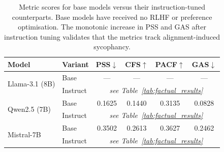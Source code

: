 \begin{table}[ht]
\centering
\caption{%
  Metric scores for base models versus their instruction-tuned counterparts.
  Base models have received no RLHF or preference optimisation.
  The monotonic increase in PSS and GAS after instruction tuning validates
  that the metrics track alignment-induced sycophancy.
}
\label{tab:base_model_validation}
\begin{tabular}{llcccc}
\toprule
\textbf{Model} & \textbf{Variant}  & \textbf{PSS}$\downarrow$  & \textbf{CFS}$\uparrow$  & \textbf{PACF}$\uparrow$  & \textbf{GAS}$\downarrow$ \\
\midrule
\multirow{2}{*}{Llama-3.1 (8B)}
  & Base    & --- & --- & --- & --- \\
  & Instruct & \multicolumn{4}{c}{\textit{see Table~\ref{tab:factual_results}}} \\
\midrule
\multirow{2}{*}{Qwen2.5 (7B)}
  & Base    & 0.1625 & 0.1440 & 0.3135 & 0.0828 \\
  & Instruct & \multicolumn{4}{c}{\textit{see Table~\ref{tab:factual_results}}} \\
\midrule
\multirow{2}{*}{Mistral-7B}
  & Base    & 0.3502 & 0.2613 & 0.3627 & 0.2462 \\
  & Instruct & \multicolumn{4}{c}{\textit{see Table~\ref{tab:factual_results}}} \\
\bottomrule
\end{tabular}
\end{table}